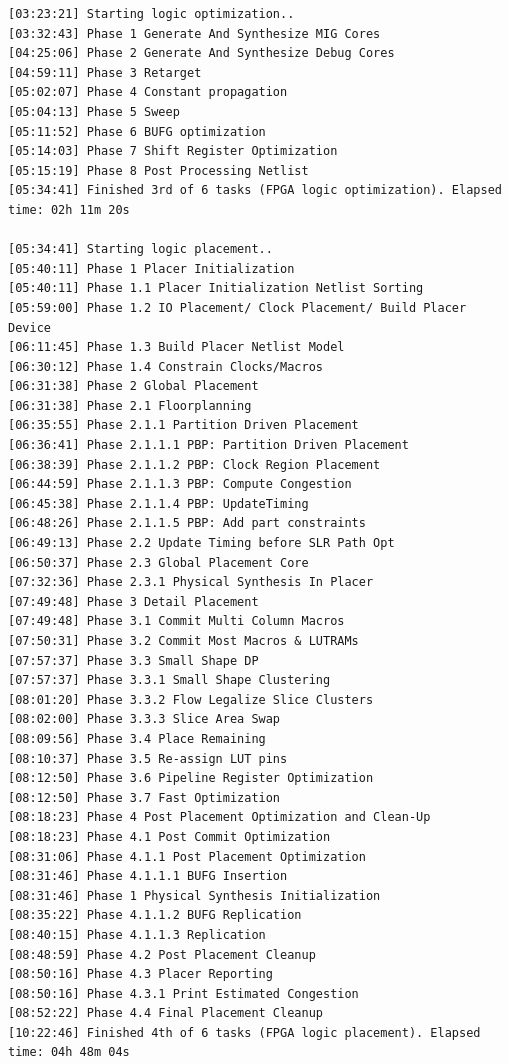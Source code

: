 \begin{lstlisting}
[03:23:21] Starting logic optimization..
[03:32:43] Phase 1 Generate And Synthesize MIG Cores
[04:25:06] Phase 2 Generate And Synthesize Debug Cores
[04:59:11] Phase 3 Retarget
[05:02:07] Phase 4 Constant propagation
[05:04:13] Phase 5 Sweep
[05:11:52] Phase 6 BUFG optimization
[05:14:03] Phase 7 Shift Register Optimization
[05:15:19] Phase 8 Post Processing Netlist
[05:34:41] Finished 3rd of 6 tasks (FPGA logic optimization). Elapsed time: 02h 11m 20s 

[05:34:41] Starting logic placement..
[05:40:11] Phase 1 Placer Initialization
[05:40:11] Phase 1.1 Placer Initialization Netlist Sorting
[05:59:00] Phase 1.2 IO Placement/ Clock Placement/ Build Placer Device
[06:11:45] Phase 1.3 Build Placer Netlist Model
[06:30:12] Phase 1.4 Constrain Clocks/Macros
[06:31:38] Phase 2 Global Placement
[06:31:38] Phase 2.1 Floorplanning
[06:35:55] Phase 2.1.1 Partition Driven Placement
[06:36:41] Phase 2.1.1.1 PBP: Partition Driven Placement
[06:38:39] Phase 2.1.1.2 PBP: Clock Region Placement
[06:44:59] Phase 2.1.1.3 PBP: Compute Congestion
[06:45:38] Phase 2.1.1.4 PBP: UpdateTiming
[06:48:26] Phase 2.1.1.5 PBP: Add part constraints
[06:49:13] Phase 2.2 Update Timing before SLR Path Opt
[06:50:37] Phase 2.3 Global Placement Core
[07:32:36] Phase 2.3.1 Physical Synthesis In Placer
[07:49:48] Phase 3 Detail Placement
[07:49:48] Phase 3.1 Commit Multi Column Macros
[07:50:31] Phase 3.2 Commit Most Macros & LUTRAMs
[07:57:37] Phase 3.3 Small Shape DP
[07:57:37] Phase 3.3.1 Small Shape Clustering
[08:01:20] Phase 3.3.2 Flow Legalize Slice Clusters
[08:02:00] Phase 3.3.3 Slice Area Swap
[08:09:56] Phase 3.4 Place Remaining
[08:10:37] Phase 3.5 Re-assign LUT pins
[08:12:50] Phase 3.6 Pipeline Register Optimization
[08:12:50] Phase 3.7 Fast Optimization
[08:18:23] Phase 4 Post Placement Optimization and Clean-Up
[08:18:23] Phase 4.1 Post Commit Optimization
[08:31:06] Phase 4.1.1 Post Placement Optimization
[08:31:46] Phase 4.1.1.1 BUFG Insertion
[08:31:46] Phase 1 Physical Synthesis Initialization
[08:35:22] Phase 4.1.1.2 BUFG Replication
[08:40:15] Phase 4.1.1.3 Replication
[08:48:59] Phase 4.2 Post Placement Cleanup
[08:50:16] Phase 4.3 Placer Reporting
[08:50:16] Phase 4.3.1 Print Estimated Congestion
[08:52:22] Phase 4.4 Final Placement Cleanup
[10:22:46] Finished 4th of 6 tasks (FPGA logic placement). Elapsed time: 04h 48m 04s 


\end{lstlisting}
